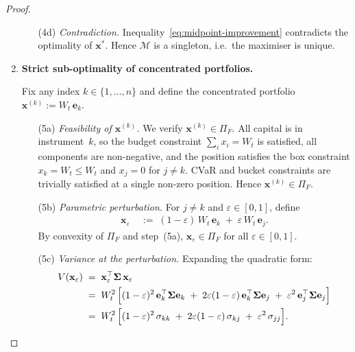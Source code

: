 \documentclass[12pt,openany]{book}
\newcommand{\bfx}{\mathbf{x}}
\numberwithin{equation}{chapter}
\theoremstyle{plain}
\theoremstyle{definition}
\theoremstyle{remark}
\numberwithin{equation}{chapter}
\theoremstyle{plain}
\newcommand{\bfe}{\mathbf{e}}
\newcommand{\bfSigma}{\boldsymbol{\Sigma}}
\begin{document}
\begin{proof}
\begin{enumerate}
\begin{enumerate}
  \item[\textup{(4d)}] \textit{Contradiction.}
        Inequality~\eqref{eq:midpoint-improvement} contradicts
        the optimality of $\bfx^*$.  Hence $\mathcal{M}$ is a
        singleton, i.e.\ the maximiser is unique.
\end{enumerate}

\item \textbf{Strict sub-optimality of concentrated portfolios.}

Fix any index $k \in \{1,\ldots,n\}$ and define the concentrated
portfolio $\bfx^{(k)} := W_t\,\bfe_k$.

\begin{enumerate}
  \item[\textup{(5a)}] \textit{Feasibility of $\bfx^{(k)}$.}
        We verify $\bfx^{(k)} \in \Pi_F$.
        All capital is in instrument~$k$, so the budget constraint
        $\sum_i x_i = W_t$ is satisfied, all components are
        non-negative, and the position satisfies the box constraint
        $x_k = W_t \leq W_t$ and $x_j = 0$ for $j \neq k$.
        CVaR and bucket constraints are trivially satisfied at a
        single non-zero position.  Hence $\bfx^{(k)} \in \Pi_F$.

  \item[\textup{(5b)}] \textit{Parametric perturbation.}
        For $j \neq k$ and $\varepsilon \in [0,1]$, define
        \begin{align}
          \bfx_\varepsilon
            &\;:=\; (1-\varepsilon)\,W_t\,\bfe_k
                  \;+\; \varepsilon\,W_t\,\bfe_j.
          \label{eq:perturbation}
        \end{align}
        By convexity of $\Pi_F$ and step~(5a),
        $\bfx_\varepsilon \in \Pi_F$ for all
        $\varepsilon \in [0,1]$.

  \item[\textup{(5c)}] \textit{Variance at the perturbation.}
        Expanding the quadratic form:
        \begin{align}
          V(\bfx_\varepsilon)
            &\;=\; \bfx_\varepsilon^\top \bfSigma\, \bfx_\varepsilon
          \nonumber\\
            &\;=\; W_t^2\,\Bigl[
                   (1-\varepsilon)^2\,\bfe_k^\top\bfSigma\bfe_k
                   \;+\; 2\varepsilon(1-\varepsilon)\,
                         \bfe_k^\top\bfSigma\bfe_j
                   \;+\; \varepsilon^2\,\bfe_j^\top\bfSigma\bfe_j
                   \Bigr]
          \nonumber\\
            &\;=\; W_t^2\,\Bigl[
                   (1-\varepsilon)^2\,\sigma_{kk}
                   \;+\; 2\varepsilon(1-\varepsilon)\,\sigma_{kj}
                   \;+\; \varepsilon^2\,\sigma_{jj}
                   \Bigr].
          \label{eq:V-perturbed}
        \end{align}


\end{enumerate}
\end{enumerate}
\end{proof}
\end{document}
